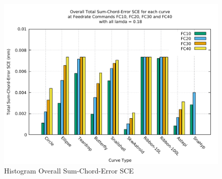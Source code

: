 \clearpage
\pagebreak
\begin{landscape}
	
\begin{figure}
\centering
\caption  {Histogram Overall Sum-Chord-Error SCE}
\label{img-Histogram Overall Sum-Chord-Error SCE}
\includegraphics[width=1.30\textwidth]{Chap4/Overall/Histogram/SCE-img-Histo-Overall-Total-Sum-Chord-Error.pdf} 
\end{figure}
	
\end{landscape}
\clearpage
\pagebreak
